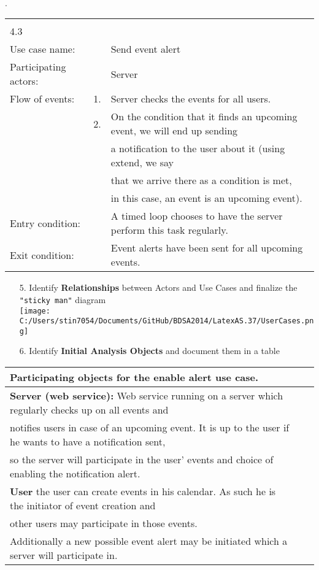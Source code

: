 \documentclass{article}
\begin{document}
	\\
	.\\
\begin{tabular}{l r @{} l}
	\multicolumn{2}{c}{} \\
	4.3&&\\
	\hline
	Use case name:	&&Send event alert\\
	\hline
	Participating actors:&&Server\\
	\hline
	Flow of events:	&1.&Server checks the events for all users.\\
				&2.&On the condition that it finds an upcoming event, we will end up sending\\
					&&a notification to the user about it (using \flqq extend\frqq, we say\\
					&&that we arrive there as a condition is met,\\
					&&in this case, an event is an upcoming event).\\
	\hline
	Entry condition:	&&A timed loop chooses to have the server perform this task regularly.\\
	\hline
	Exit condition:	&&Event alerts have been sent for all upcoming events.\\
	\hline
\end{tabular}

	\pagebreak{}

\begin{enumerate}
		\item[5.] Identify \textbf{Relationships} between Actors and Use Cases and finalize the \verb= "sticky man"=  diagram\\
		\texttt{[image: C:/Users/stin7054/Documents/GitHub/BDSA2014/LatexAS.37/UserCases.png]}\\
		\pagebreak{}
		\item[6.] Identify \textbf{Initial Analysis Objects} and document them in a table\\
\end{enumerate}

\begin{tabular}{l r @{} l}
	\textbf{Participating objects for the enable alert use case.}\\
	\hline
	\textbf{Server (web service):} Web service running on a server which regularly checks up on all events and \\
	notifies users in case of an upcoming event. It is up to the user if he wants to have a notification sent,\\ 
	so the server will participate in the user’ events and choice of enabling the notification alert.\\
	\hline
	\textbf{User} the user can create events in his calendar. As such he is the initiator of event creation and \\
	other users may participate in those events. \\
	Additionally a new possible event alert may be initiated which a server will participate in.\\
	\hline
\end{tabular}
	\\
\end{document}
